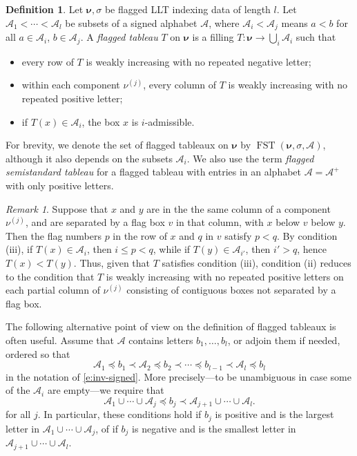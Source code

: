 \documentclass[12pt]{amsart}
\theoremstyle{definition}
\newtheorem{defn}[thm]{Definition}
\theoremstyle{remark}
\newtheorem{remark}[thm]{Remark}
\newcommand{\nubold}{{\boldsymbol \nu }}
\newcommand{\Acal}{{\mathcal A}}
\newcommand{\sgnlt}{\prec}
\newcommand{\sgnle}{\preccurlyeq}
\DeclareMathOperator{\FSST}{FST}
\begin{document}
\begin{defn}\label{def:FSST}
Let $\nubold ,\sigma $ be flagged LLT indexing data of length $l$. Let
$\Acal _{1}<\cdots <\Acal _{l}$ be subsets of a signed alphabet $\Acal
$, where $\Acal _{i}<\Acal _{j}$ means $a<b$ for all $a\in \Acal
_{i}$, $b\in \Acal _{j}$.  A {\em flagged tableau} $T$ on $\nubold $
is a filling $T\colon \nubold \rightarrow \bigcup _{i}\Acal _{i}$ such
that
\begin{itemize}
\item [(i)] every row of $T$ is weakly increasing with no repeated
negative letter;
\item [(ii)] within each component $\nu ^{(j)}$, every column of $T$
is weakly increasing with no repeated positive letter;
\item [(iii)] if $T(x)\in \Acal _{i}$, the box $x$ is $i$-admissible.
\end{itemize}
For brevity, we denote the set of flagged tableaux on $\nubold $ by
$\FSST (\nubold, \sigma ,\Acal )$, although it also depends on the
subsets $\Acal _{i}$.  We also use the term {\em flagged semistandard
tableau} for a flagged tableau with entries in an alphabet $\Acal
=\Acal ^{+}$ with only positive letters.
\end{defn}

\begin{remark}\label{rem:FSST}
Suppose that $x$ and $y$ are in the the same column of a component
$\nu ^{(j)}$, and are separated by a flag box $v$ in that column, with
$x$ below $v$ below $y$.  Then the flag numbers $p$ in the row of $x$
and $q$ in $v$ satisfy $p<q$.  By condition (iii), if $T(x)\in \Acal
_{i}$, then $i\leq p<q$, while if $T(y)\in \Acal _{i'}$, then $i'>q$,
hence $T(x)<T(y)$.  Thus, given that $T$ satisfies condition (iii),
condition (ii) reduces to the condition that $T$ is weakly increasing
with no repeated positive letters on each partial column of $\nu
^{(j)}$ consisting of contiguous boxes not separated by a flag box.
\end{remark}

The following alternative point of view on the definition of flagged
tableaux is often useful.  Assume that $\Acal $ contains letters
$b_{1},\ldots,b_{l}$, or adjoin them if needed, ordered so that
\begin{equation}\label{e:A-with-bi}
\Acal _{1} \sgnle b_{1} \sgnlt \Acal _{2} \sgnle b_{2} \sgnlt \cdots
\sgnle b_{l-1} \sgnlt \Acal _{l} \sgnle b_{l}
\end{equation}
in the notation of \eqref{e:inv-signed}.  More precisely---to
be unambiguous in case some of the $\Acal
_{i}$ are empty---we require that
\begin{equation}\label{e:A-with-bi-better}
\Acal _{1} \cup \cdots \cup  \Acal _{j} \sgnle b_{j} \sgnlt \Acal _{j+1}
\cup  \cdots \cup  \Acal _{l}.
\end{equation}
for all $j$.  In particular, these conditions hold if $b_{j}$ is
positive and is the largest letter in $\Acal _{1} \cup \cdots \cup
\Acal _{j}$, of if $b_{j}$ is negative and is the smallest letter in $
\Acal _{j+1}\cup \cdots \cup \Acal _{l}$.
\end{document}
